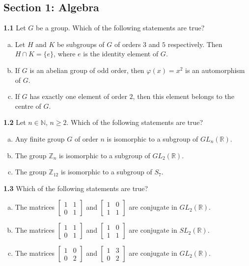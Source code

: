 \documentclass[11pt,a4paper]{article}
\newcommand{\N}{\mathbb{N}}
\newcommand{\Z}{\mathbb{Z}}
\newcommand{\R}{\mathbb{R}}
\newcommand{\examsec}[1]{%
  \subsection*{#1}
  \vspace{-2pt}
}
\newcommand{\qitem}[1]{\par\medskip\noindent\textbf{#1}\hspace{0.5em}}
\begin{document}
\examsec{Section 1: Algebra}

\qitem{1.1} Let $G$ be a group. Which of the following statements are true?
\begin{enumerate}[a.]
  \item Let $H$ and $K$ be subgroups of $G$ of orders $3$ and $5$ respectively. Then $H \cap K = \{e\}$, where $e$ is the identity element of $G$.
  \item If $G$ is an abelian group of odd order, then $\varphi(x) = x^2$ is an automorphism of $G$.
  \item If $G$ has exactly one element of order $2$, then this element belongs to the centre of $G$.
\end{enumerate}

\qitem{1.2} Let $n \in \N$, $n \ge 2$. Which of the following statements are true?
\begin{enumerate}[a.]
  \item Any finite group $G$ of order $n$ is isomorphic to a subgroup of $GL_n(\R)$.
  \item The group $\Z_n$ is isomorphic to a subgroup of $GL_2(\R)$.
  \item The group $\Z_{12}$ is isomorphic to a subgroup of $S_7$.
\end{enumerate}

\qitem{1.3} Which of the following statements are true?
\begin{enumerate}[a.]
  \item The matrices $\begin{bmatrix} 1 & 1 \\ 0 & 1 \end{bmatrix}$ and $\begin{bmatrix} 1 & 0 \\ 1 & 1 \end{bmatrix}$ are conjugate in $GL_2(\R)$.
  \item The matrices $\begin{bmatrix} 1 & 1 \\ 0 & 1 \end{bmatrix}$ and $\begin{bmatrix} 1 & 0 \\ 1 & 1 \end{bmatrix}$ are conjugate in $SL_2(\R)$.
  \item The matrices $\begin{bmatrix} 1 & 0 \\ 0 & 2 \end{bmatrix}$ and $\begin{bmatrix} 1 & 3 \\ 0 & 2 \end{bmatrix}$ are conjugate in $GL_2(\R)$.
\end{enumerate}
\end{document}
